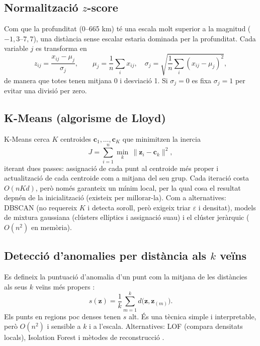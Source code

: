 \documentclass[10.5pt,a4paper]{article}
\newcommand{\py}[1]{\texttt{\detokenize{#1}}}
\begin{document}
\subsection{Normalitzaci\'o $z$-score}
Com que la profunditat (0--665 km) t\'e una escala molt superior a la magnitud ($-1{,}3$--$7{,}7$), una dist\`ancia sense escalar estaria dominada per la profunditat. Cada variable $j$ es transforma en
\begin{equation}
z_{ij}=\frac{x_{ij}-\mu_j}{\sigma_j},\qquad \mu_j=\frac1n\sum_i x_{ij},\quad \sigma_j=\sqrt{\frac1n\sum_i (x_{ij}-\mu_j)^2},
\end{equation}
de manera que totes tenen mitjana 0 i desviaci\'o 1. Si $\sigma_j=0$ es fixa $\sigma_j=1$ per evitar una divisi\'o per zero.

\subsection{K-Means (algorisme de Lloyd)}
K-Means \cite{lloyd,macqueen} cerca $K$ centroides $\mathbf c_1,\dots,\mathbf c_K$ que minimitzen la inercia
\begin{equation}
J=\sum_{i=1}^{n}\min_{k}\,\lVert \mathbf z_i-\mathbf c_k\rVert^2 ,
\end{equation}
iterant dues passes: assignaci\'o de cada punt al centroide m\'es proper i actualitzaci\'o de cada centroide com a mitjana del seu grup. Cada iteraci\'o costa $O(nKd)$, per\`o nom\'es garanteix un m\'inim local, per la qual cosa el resultat depn\'en de la inicialitzaci\'o (existeix \py{k-means++} \cite{kmpp} per millorar-la). Com a alternatives: DBSCAN (no requereix $K$ i detecta soroll, per\`o exigeix triar $\varepsilon$ i densitat), models de mixtura gaussiana (cl\'usters el\textperiodcentered l\'iptics i assignaci\'o suau) i el cl\'uster jer\`arquic ($O(n^2)$ en mem\`oria).

\subsection{Detecci\'o d'anomalies per dist\`ancia als $k$ ve\"ins}
Es defineix la puntuaci\'o d'anomalia d'un punt com la mitjana de les dist\`ancies als seus $k$ ve\"ins m\'es propers \cite{ramaswamy}:
\begin{equation}
s(\mathbf z)=\frac1k\sum_{m=1}^{k} d\bigl(\mathbf z,\mathbf z_{(m)}\bigr).
\end{equation}
Els punts en regions poc denses tenen $s$ alt. \'Es una t\`ecnica simple i interpretable, per\`o $O(n^2)$ i sensible a $k$ i a l'escala. Alternatives: LOF (compara densitats locals), Isolation Forest i m\`etodes de reconstrucci\'o \cite{chandola}.
\end{document}

